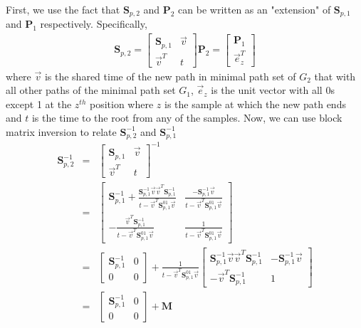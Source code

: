 First, we use the fact that $\mathbf{S}_{p,2}$ and $\mathbf{P}_2$ can be written as an "extension" of $\mathbf{S}_{p,1}$ and $\mathbf{P}_1$ respectively. Specifically,
\begin{eqnarray}
    \mathbf{S}_{p,2} = \begin{bmatrix}
        \mathbf{S}_{p,1} & \vec{v} \\
        \vec{v}^T & t
    \end{bmatrix} 
    \mathbf{P}_2 = \begin{bmatrix}
        \mathbf{P}_1 \\ 
        \vec{e}_z^T
    \end{bmatrix}
\end{eqnarray}
where $\vec{v}$ is the shared time of the new path in minimal path set of $G_2$ that with all other paths of the minimal path set $G_1$, $\vec{e}_z$ is the unit vector with all 0s except 1 at the $z^{th}$ position where $z$ is the sample at which the new path ends and $t$ is the time to the root from any of the samples. Now, we can use block matrix inversion to relate $\mathbf{S}_{p,2}^{-1}$ and $\mathbf{S}_{p,1}^{-1}$
\begin{eqnarray}
    \mathbf{S}_{p,2}^{-1} &=& \begin{bmatrix}
        \mathbf{S}_{p,1} & \vec{v} \\
        \vec{v}^T & t
    \end{bmatrix}^{-1} \\
    &=& \begin{bmatrix}
        \mathbf{S}_{p,1}^{-1} + \frac{\mathbf{S}_{p,1}^{-1}\vec{v}\vec{v}^T\mathbf{S}_{p,1}^{-1}}{t-\vec{v}^T\mathbf{S}_{p,1}^{01}\vec{v}} & \frac{-\mathbf{S}_{p,1}^{-1}\vec{v}}{t-\vec{v}^T\mathbf{S}_{p,1}^{01}\vec{v}}  \\
        -\frac{\vec{v}^T\mathbf{S}_{p,1}^{-1}}{t-\vec{v}^T\mathbf{S}_{p,1}^{01}\vec{v}} & \frac{1}{t-\vec{v}^T\mathbf{S}_{p,1}^{01}\vec{v}} 
    \end{bmatrix} \\
    &=& \begin{bmatrix}
        \mathbf{S}_{p,1}^{-1} & 0 \\
        0 & 0 
    \end{bmatrix} + \frac{1}{t-\vec{v}^T\mathbf{S}_{p,1}^{01}\vec{v}} \begin{bmatrix}
        \mathbf{S}_{p,1}^{-1}\vec{v}\vec{v}^T\mathbf{S}_{p,1}^{-1} & -\mathbf{S}_{p,1}^{-1}\vec{v} \\
        -\vec{v}^T\mathbf{S}_{p,1}^{-1} & 1 
    \end{bmatrix}\\
    &=& \begin{bmatrix}
        \mathbf{S}_{p,1}^{-1} & 0 \\
        0 & 0 
    \end{bmatrix} + \mathbf{M} 
\end{eqnarray}
